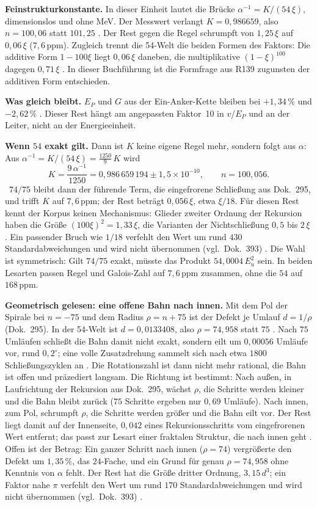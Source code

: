 \textbf{Feinstrukturkonstante.} In dieser Einheit lautet die Brücke $\alpha^{-1}=K/(54\,\xi)$,
dimensionslos und ohne MeV. Der Messwert verlangt $K=0{,}986659$, also $n=100{,}06$ statt $101{,}25$
\KM. Der Rest gegen die Regel schrumpft von $1{,}25\,\xi$ auf $0{,}06\,\xi$ ($7{,}6$\,ppm). Zugleich
trennt die 54-Welt die beiden Formen des Faktors: Die additive Form $1-100\xi$ liegt $0{,}06\,\xi$
daneben, die multiplikative $(1-\xi)^{100}$ dagegen $0{,}71\,\xi$ \KM. In dieser Buchführung ist die
Formfrage aus R139 zugunsten der additiven Form entschieden.

\textbf{Was gleich bleibt.} $E_P$ und $G$ aus der Ein-Anker-Kette bleiben bei $+1{,}34\,\%$ und
$-2{,}62\,\%$ \KM. Dieser Rest hängt am angepassten Faktor~10 in $v/E_P$ und an der Leiter, nicht an
der Energieeinheit.

\textbf{Wenn $54$ exakt gilt.} Dann ist $K$ keine eigene Regel mehr, sondern folgt aus $\alpha$:
Aus $\alpha^{-1}=K/(54\,\xi)=\tfrac{1250}{9}\,K$ wird
\begin{equation}
  K=\frac{9\,\alpha^{-1}}{1250}=0{,}986\,659\,194\pm1{,}5\times10^{-10},\qquad n=100{,}056 .
\end{equation}
\KM\ $74/75$ bleibt dann der führende Term, die eingefrorene Schließung aus Dok.~295, und trifft
$K$ auf $7{,}6$\,ppm; der Rest beträgt $0{,}056\,\xi$, etwa $\xi/18$. Für diesen Rest kennt der Korpus
keinen Mechanismus: Glieder zweiter Ordnung der Rekursion haben die Größe $(100\xi)^2=1{,}33\,\xi$,
die Varianten der Nichtschließung $0{,}5$ bis $2\,\xi$ \KM. Ein passender Bruch wie $1/18$ verfehlt
den Wert um rund $430$ Standardabweichungen und wird nicht übernommen (vgl.\ Dok.~393) \SM. Die
Wahl ist symmetrisch: Gilt $74/75$ exakt, müsste das Produkt $54{,}0004\,E_u^2$ sein. In beiden
Lesarten passen Regel und Galois-Zahl auf $7{,}6$\,ppm zusammen, ohne die $54$ auf $168$\,ppm.

\textbf{Geometrisch gelesen: eine offene Bahn nach innen.} Mit dem Pol der Spirale bei $n=-75$ und
dem Radius $\rho=n+75$ ist der Defekt je Umlauf $d=1/\rho$ (Dok.~295). In der 54-Welt ist
$d=0{,}0133408$, also $\rho=74{,}958$ statt $75$ \KM. Nach $75$ Umläufen schließt die Bahn damit nicht
exakt, sondern eilt um $0{,}00056$ Umläufe vor, rund $0{,}2^\circ$; eine volle Zusatzdrehung sammelt
sich nach etwa $1800$ Schließungszyklen an \KM. Die Rotationszahl ist dann nicht mehr rational, die
Bahn ist offen und präzediert langsam. Die Richtung ist bestimmt: Nach außen, in Laufrichtung der
Rekursion aus Dok.~295, wächst $\rho$, die Schritte werden kleiner und die Bahn bleibt zurück ($75$
Schritte ergeben nur $0{,}69$ Umläufe). Nach innen, zum Pol, schrumpft $\rho$, die Schritte werden
größer und die Bahn eilt vor. Der Rest liegt damit auf der Innenseite, $0{,}042$ eines
Rekursionsschritts vom eingefrorenen Wert entfernt; das passt zur Lesart einer fraktalen Struktur,
die nach innen geht \SM. Offen ist der Betrag: Ein ganzer Schritt nach innen ($\rho=74$) vergrößerte den Defekt um
$1{,}35\,\%$, das $24$-Fache, und ein Grund für genau $\rho=74{,}958$ ohne Kenntnis von $\alpha$ fehlt. Der Rest hat die
Größe dritter Ordnung, $3{,}15\,d^3$; ein Faktor nahe $\pi$ verfehlt den Wert um rund
$170$ Standardabweichungen und wird nicht übernommen (vgl.\ Dok.~393) \SM.


